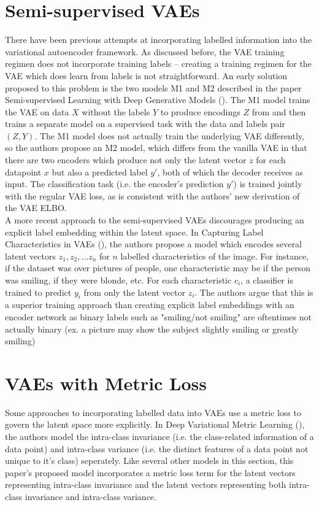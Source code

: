 \documentclass[./dissertation.tex]{subfiles}
\begin{document}
\section{Semi-supervised VAEs}
There have been previous attempts at incorporating labelled information into the variational autoencoder framework. As discussed before, the VAE training regimen does not incorporate training labels -- creating a training regimen for the VAE which does learn from labels is not straightforward. An early solution proposed to this problem is the two models M1 and M2 described in the paper Semi-supervised Learning with Deep Generative Models (\cite{kingma2014autoencoding}). The M1 model trains the VAE on data $X$ without the labels $Y$ to produce encodings $Z$ from and then trains a separate model on a supervised task with the data and labels pair $(Z, Y)$. The M1 model does not actually train the underlying VAE differently, so the authors propose an M2 model, which differs from the vanilla VAE in that there are two encoders which produce not only the latent vector $z$ for each datapoint $x$ but also a predicted label $y'$, both of which the decoder receives as input. The classification task (i.e. the encoder's prediction $y'$) is trained jointly with the regular VAE loss, as is consistent with the authors' new derivation of the VAE ELBO. \\

A more recent approach to the semi-supervised VAEs discourages producing an explicit label embedding within the latent space. In Capturing Label Characteristics in VAEs (\cite{joy2020capturing}), the authors propose a model which encodes several latent vectors $z_{1}, z_{2}, ... z_{n}$ for $n$ labelled characteristics of the image. For instance, if the dataset was over pictures of people, one characteristic may be if the person was smiling, if they were blonde, etc. For each characteristic $c_{i}$, a classifier is trained to predict $y_{i}$ from only the latent vector $z_{i}$. The authors argue that this is a superior training approach than creating explicit label embeddings with an encoder network as binary labels such as "smiling/not smiling" are oftentimes not actually binary (ex. a picture may show the subject slightly smiling or greatly smiling)

\section{VAEs with Metric Loss}

Some approaches to incorporating labelled data into VAEs use a metric loss to govern the latent space more explicitly. In Deep Variational Metric Learning (\cite{lin2018deep}), the authors model the intra-class invariance (i.e. the class-related information of a data point) and intra-class variance (i.e. the distinct features of a data point not unique to it's class) seperately. Like several other models in this section, this paper's proposed model incorporates a metric loss term for the latent vectors representing intra-class invariance and the latent vectors representing both intra-class invariance and intra-class variance. \\
\end{document}
